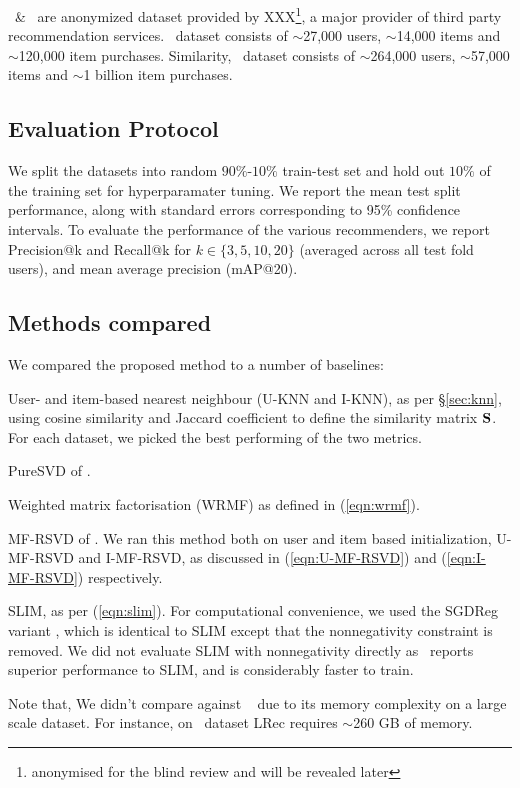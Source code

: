 \Lowes\ \& \Guitar \ are anonymized dataset provided by XXX\footnote{{\scriptsize anonymised for the blind review and will be revealed later}}, a major provider of third party recommendation services. \Guitar \ dataset consists of $\sim$27,000 users, $\sim$14,000 items and $\sim$120,000 item purchases. Similarity, \Lowes \ dataset consists of $\sim$264,000 users, $\sim$57,000 items and $\sim$1 billion item purchases. 

\subsection{Evaluation Protocol}
We split the datasets into random $90\%$-$10\%$ train-test set and hold out $10\%$ of the training set for hyperparamater tuning. We report the mean test split performance, along with standard errors corresponding to 95\% confidence intervals.
To evaluate the performance of the various recommenders, we report Precision@k and Recall@k for $k \in \{ 3, 5, 10, 20 \}$ (averaged across all test fold users), and mean average precision (mAP@20).


\subsection{Methods compared}

We compared the proposed method to a number of baselines:
\begin{compactitem}

	\item User- and item-based nearest neighbour (U-KNN and I-KNN), as per \S\ref{sec:knn}, using  cosine similarity and Jaccard coefficient to define the similarity matrix $\mathbf{S}$. For each dataset, we picked the best performing of the two metrics.

	\item PureSVD of \citet{Cremonesi:2010}.

	\item Weighted matrix factorisation (WRMF) as defined in (\ref{eqn:wrmf}).

	\item MF-RSVD of \citet{Tang:2013}.  We ran this method both on user and item based initialization, U-MF-RSVD  and I-MF-RSVD, as discussed in (\ref{eqn:U-MF-RSVD}) and (\ref{eqn:I-MF-RSVD}) respectively.
	\item SLIM, as per (\ref{eqn:slim}). For computational convenience, we used the SGDReg variant \citep{Levy:2013}, which is identical to SLIM  except that the nonnegativity constraint is removed. We did not evaluate SLIM with nonnegativity directly as~\citet{Levy:2013} reports superior performance to SLIM, and is considerably faster to train.
\end{compactitem}
Note that, We didn't compare against ~\citep{Sedhain:2016} due to its memory complexity on a large scale dataset. For instance, on \Lowes \ dataset LRec requires $\sim$260 GB of memory. 